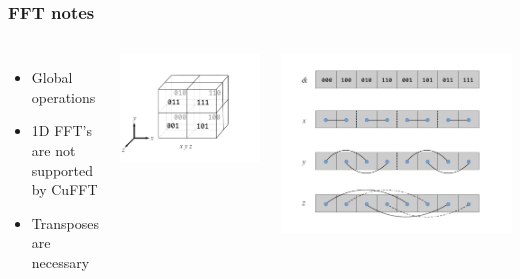 \documentclass{beamer}
\begin{document}
\begin{frame}
\frametitle{FFT notes}
\begin{columns}
\begin{itemize}
\item Global operations
\item 1D FFT's are not supported by CuFFT
\item Transposes are necessary
\end{itemize}
\center \includegraphics[width=\textwidth]{../data/gpu/fft/fft_fig.png}

\center \includegraphics[width=\textwidth]{../data/gpu/fft/fft_fig2.png}
\end{columns}

\end{frame}
\end{document}
